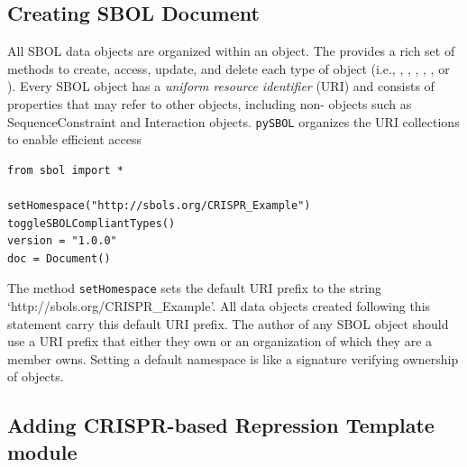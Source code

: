 \subsection*{Creating SBOL Document}
 All SBOL data objects are organized within an  object. The  provides a rich set of methods to create, access, update, and delete each type of  object (i.e., , , , , , or ). Every SBOL object has a \emph{uniform resource identifier} (URI) and consists of properties that may refer to other objects, including non- objects such as SequenceConstraint and Interaction objects. \texttt{pySBOL} organizes the URI collections to enable efficient access
 
\vspace{\abovedisplayskip}
\begin{minipage}{0.95\textwidth} 
\begin{lstlisting}
from sbol import *

setHomespace("http://sbols.org/CRISPR_Example")
toggleSBOLCompliantTypes()
version = "1.0.0"
doc = Document()
\end{lstlisting}
\end{minipage}

The method \lstinline+setHomespace+ sets the default URI prefix to the string `http://sbols.org/CRISPR\_Example'. All data objects created following this statement carry this default URI prefix. The author of any SBOL object should use a URI prefix that either they own or an organization of which they are a member owns. Setting a default namespace is like a signature verifying ownership of objects. 

\subsection*{Adding CRISPR-based Repression Template module}
